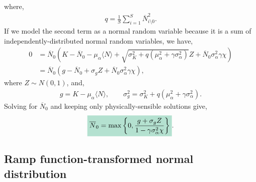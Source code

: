 \documentclass[10pt]{article}
\newcommand{\mathcolorbox}[1]{\colorbox{hlcol}{$\displaystyle #1$}}
\begin{document}
where,
\begin{align}
	q = \frac{1}{S} \sum_{i=1}^S \overline{N}_{i \setminus 0}^2.
\end{align}
If we model the second term as a normal random variable because it is a sum of independently-distributed normal random variables, we have,
\begin{align}
	0 &= \overline{N}_0
	\left(
		{K}
		-
		\overline N_0
		-
		\mu_\alpha \langle N \rangle 
		+ \sqrt{\sigma_K^2 + q (\mu_\alpha^2 + \gamma\sigma_\alpha^2)}Z
		+
		\overline{N}_0 \sigma_\alpha^2 \gamma \chi 
	\right)
	\\
	&
	=\overline{N}_0 \left(
		g-\overline N_0 + \sigma_g Z + \overline{N}_0 \sigma_\alpha^2 \gamma \chi 
	\right)
	,
\end{align}
where $Z \sim N(0,1)$, and,
\begin{align}
	g = K - \mu_\alpha\langle N\rangle,
	\qquad 
	\sigma_g^2 = \sigma_K^2 + q(\mu_\alpha^2 + \gamma \sigma_\alpha^2).
\end{align}
Solving for $\overline{N}_0$ and keeping only physically-sensible solutions give,
\begin{align}
	\mathcolorbox{
	\overline N_0
	=
	\max
	\left\{
		0,
		\frac{g + \sigma_g Z}{1-\gamma \sigma_\alpha^2  \chi}
	\right\}}.
\end{align}

\subsection{Ramp function-transformed normal distribution\label{rampNormal}}
\end{document}
